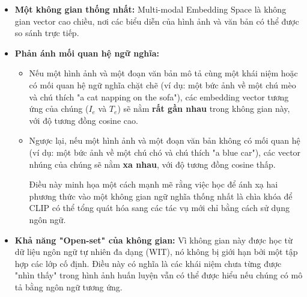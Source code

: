 \begin{itemize}
    \item \textbf{Một không gian thống nhất:} Multi-modal Embedding Space là không gian vector cao chiều, nơi các biểu diễn của hình ảnh và văn bản có thể được so sánh trực tiếp.
    \item \textbf{Phản ánh mối quan hệ ngữ nghĩa:}
    \begin{itemize}
        \item Nếu một hình ảnh và một đoạn văn bản mô tả cùng một khái niệm hoặc có mối quan hệ ngữ nghĩa chặt chẽ (ví dụ: một bức ảnh về một chú mèo và chú thích "a cat napping on the sofa"), các embedding vector tương ứng của chúng ($I_e$ và $T_e$) sẽ nằm \textbf{rất gần nhau} trong không gian này, với độ tương đồng cosine cao.
        \item Ngược lại, nếu một hình ảnh và một đoạn văn bản không có mối quan hệ (ví dụ: một bức ảnh về một chú chó và chú thích "a blue car"), các vector nhúng của chúng sẽ nằm \textbf{xa nhau}, với độ tương đồng cosine thấp.
        
        Điều này minh họa một cách mạnh mẽ rằng việc học để ánh xạ hai phương thức vào một không gian ngữ nghĩa thống nhất là chìa khóa để CLIP có thể tổng quát hóa sang các tác vụ mới chỉ bằng cách sử dụng ngôn ngữ.
    \end{itemize}
    \item \textbf{Khả năng "Open-set" của không gian:} Vì không gian này được học từ dữ liệu ngôn ngữ tự nhiên đa dạng (WIT), nó không bị giới hạn bởi một tập hợp các lớp cố định. Điều này có nghĩa là các khái niệm chưa từng được "nhìn thấy" trong hình ảnh huấn luyện vẫn có thể được hiểu nếu chúng có mô tả bằng ngôn ngữ tương ứng.
\end{itemize}